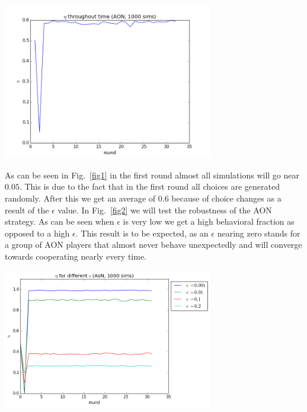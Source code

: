 \documentclass[letterpaper]{article}
\begin{document}
\includegraphics[width=3.6in,angle=0]{img/cfraction_aon.png}
\label{fig1}
\vspace{5 mm}

As can be seen in Fig.~\ref{fig1} in the first round almost all simulations will go near $0.05$. This is due to the fact that in the first round all choices are generated randomly. After this we get an average of $0.6$ because of choice changes as a result of the $\epsilon$  value.
In Fig.~\ref{fig2} we will test the robustness of the AON strategy. As can be seen when $\epsilon$ is very low we get a high behavioral fraction as opposed to a high $\epsilon$. This result is to be expected, as an $\epsilon$ nearing zero stands for a group of AON players that almost never behave unexpectedly and will converge towards cooperating nearly every time.

\vspace{5 mm}
\includegraphics[width=3.6in,angle=0]{img/cfraction_epsilon_aon.png}
\label{fig2}
\vspace{5 mm}
\end{document}
